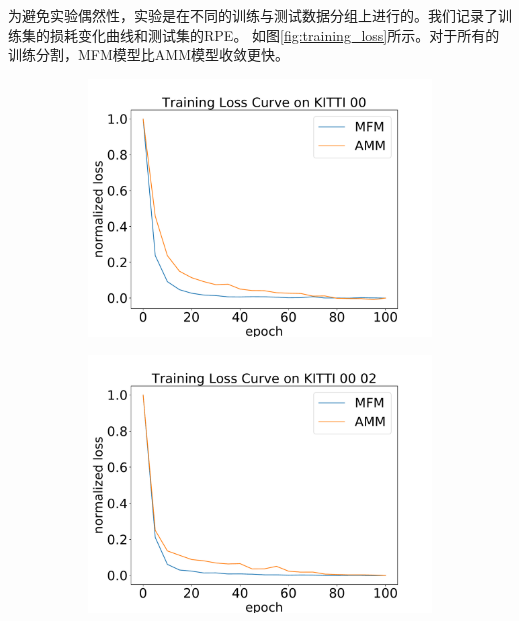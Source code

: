 为避免实验偶然性，实验是在不同的训练与测试数据分组上进行的。我们记录了训练集的损耗变化曲线和测试集的{RPE}。
如图\ref{fig:training_loss}所示。对于所有的训练分割，MFM模型比{AMM}模型收敛更快。
\begin{figure}[ht]
    \centering
    \begin{subfigure}[b]{0.225\textwidth}
        \includegraphics[width=\textwidth]{datavo/training_loss_0.pdf}
        \caption{}
        \label{fig:tl_0}
    \end{subfigure}
    \begin{subfigure}[b]{0.225\textwidth}
        \includegraphics[width=\textwidth]{datavo/training_loss_0-2.pdf}
        \caption{}
        \label{fig:tl_02}
    \end{subfigure}

\end{figure}
